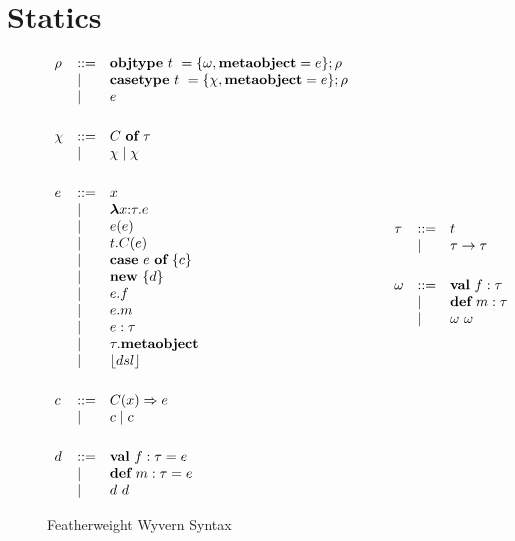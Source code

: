 \section{Statics}

\begin{figure}
\centering
\[
\begin{array}{lll}
\rho & \bnfdef & \keyw{objtype}~ t~ = \{ \omega, \keyw{metaobject}=e \}; \rho \\
     & \bnfalt & \keyw{casetype}~ t~ = \{ \chi, \keyw{metaobject}=e \}; \rho\\
     & \bnfalt & e\\
     \\[1ex]
\chi & \bnfdef & C~\keyw{of}~\tau\\
     & \bnfalt & \chi \bnfalt \chi \\
\\[1ex]
e    & \bnfdef & x \\
     & \bnfalt & \boldsymbol\lambda x{:}\tau . e \\ %
     & \bnfalt & e(e) \\
     & \bnfalt & t.C(e) \\
     & \bnfalt & \keyw{case}~e~\keyw{of}~\{ c \} \\
     & \bnfalt & \keyw{new}~ \{ d \}\\
     & \bnfalt & e.f \\
     & \bnfalt & e.m \\
     & \bnfalt & e : \tau\\
     & \bnfalt & \tau.\keyw{metaobject}\\
     & \bnfalt & \lfloor dsl \rfloor \\
\\[1ex]
c    & \bnfdef & C(x) \Rightarrow e\\
     & \bnfalt & c \bnfalt c\\
	 \\[1ex]
d    & \bnfdef & \keyw{val}~ f:\tau = e \\
     & \bnfalt & \keyw{def}~ m:\tau = e \\
     & \bnfalt & d~d
\end{array}
\begin{array}{lll}
~~~~
\end{array}
\begin{array}{lll}
\tau & \bnfdef & t\\
     & \bnfalt & \tau \rightarrow \tau \\
\\[1ex]

\omega   & \bnfdef & \keyw{val}~ f:\tau\\
         & \bnfalt & \keyw{def}~ m:\tau \\
         & \bnfalt & \omega~\omega 
\\[1ex]
\end{array}
\]
\caption{Featherweight Wyvern Syntax}
\label{fig:core2-syntax}
\end{figure}


